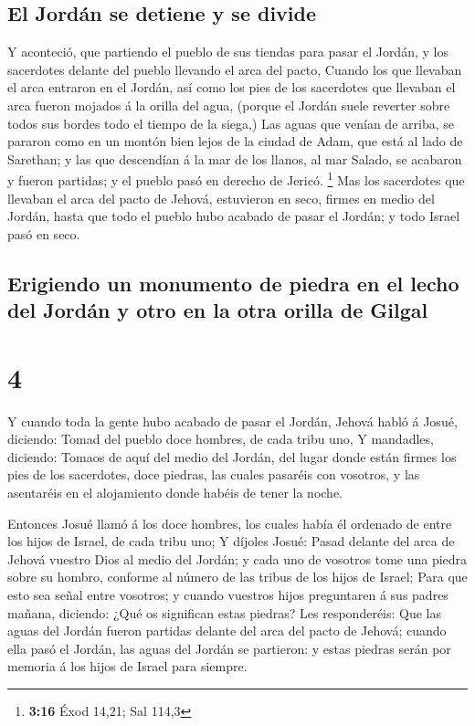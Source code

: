 \hypertarget{el-jorduxe1n-se-detiene-y-se-divide}{%
\subsection{El Jordán se detiene y se
divide}\label{el-jorduxe1n-se-detiene-y-se-divide}}

 Y aconteció, que partiendo el pueblo de sus tiendas para
pasar el Jordán, y los sacerdotes delante del pueblo llevando el arca
del pacto,  Cuando los que llevaban el arca entraron en
el Jordán, así como los pies de los sacerdotes que llevaban el arca
fueron mojados á la orilla del agua, (porque el Jordán suele reverter
sobre todos sus bordes todo el tiempo de la siega,)  Las
aguas que venían de arriba, se pararon como en un montón bien lejos de
la ciudad de Adam, que está al lado de Sarethan; y las que descendían á
la mar de los llanos, al mar Salado, se acabaron y fueron partidas; y el
pueblo pasó en derecho de Jericó. \footnote{\textbf{3:16} Éxod 14,21;
  Sal 114,3}  Mas los sacerdotes que llevaban el arca del
pacto de Jehová, estuvieron en seco, firmes en medio del Jordán, hasta
que todo el pueblo hubo acabado de pasar el Jordán; y todo Israel pasó
en seco.

\hypertarget{erigiendo-un-monumento-de-piedra-en-el-lecho-del-jorduxe1n-y-otro-en-la-otra-orilla-de-gilgal}{%
\subsection{Erigiendo un monumento de piedra en el lecho del Jordán y
otro en la otra orilla de
Gilgal}\label{erigiendo-un-monumento-de-piedra-en-el-lecho-del-jorduxe1n-y-otro-en-la-otra-orilla-de-gilgal}}

\hypertarget{section-3}{%
\section{4}\label{section-3}}

 Y cuando toda la gente hubo acabado de pasar el Jordán,
Jehová habló á Josué, diciendo:  Tomad del pueblo doce
hombres, de cada tribu uno,  Y mandadles, diciendo: Tomaos
de aquí del medio del Jordán, del lugar donde están firmes los pies de
los sacerdotes, doce piedras, las cuales pasaréis con vosotros, y las
asentaréis en el alojamiento donde habéis de tener la noche.

 Entonces Josué llamó á los doce hombres, los cuales había
él ordenado de entre los hijos de Israel, de cada tribu uno;
 Y díjoles Josué: Pasad delante del arca de Jehová vuestro
Dios al medio del Jordán; y cada uno de vosotros tome una piedra sobre
su hombro, conforme al número de las tribus de los hijos de Israel;
 Para que esto sea señal entre vosotros; y cuando vuestros
hijos preguntaren á sus padres mañana, diciendo: ¿Qué os significan
estas piedras?  Les responderéis: Que las aguas del Jordán
fueron partidas delante del arca del pacto de Jehová; cuando ella pasó
el Jordán, las aguas del Jordán se partieron: y estas piedras serán por
memoria á los hijos de Israel para siempre.

